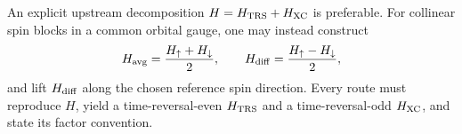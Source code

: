 An explicit upstream decomposition $H=H_{\mathrm{TRS}}+H_{\mathrm{XC}}$ is preferable. For collinear spin blocks in a common orbital gauge, one may instead construct
\begin{equation}
H_{\rm avg}=\frac{H_\uparrow+H_\downarrow}{2},
\qquad
H_{\rm diff}=\frac{H_\uparrow-H_\downarrow}{2},
\label{eq:collinear-split}
\end{equation}
and lift $H_{\rm diff}$ along the chosen reference spin direction. Every route must reproduce $H$, yield a time-reversal-even $H_{\mathrm{TRS}}$ and a time-reversal-odd $H_{\mathrm{XC}}$, and state its factor convention.
